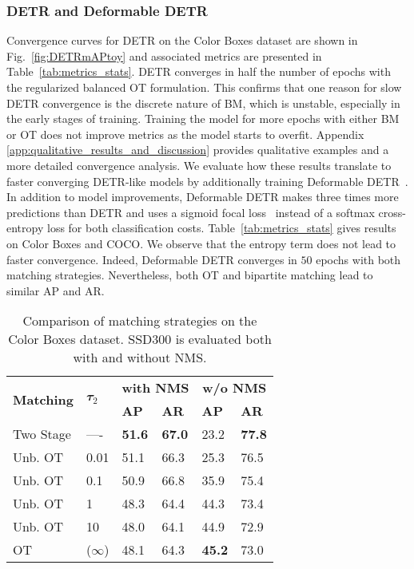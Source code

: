 \subsubsection{DETR and Deformable DETR} Convergence curves for DETR on the Color Boxes dataset are shown in Fig.~\ref{fig:DETRmAPtoy} and associated metrics are presented in Table~\ref{tab:metrics_stats}. DETR converges in half the number of epochs with the regularized balanced OT formulation. This confirms that one reason for slow DETR convergence is the discrete nature of BM, which is unstable, especially in the early stages of training. Training the model for more epochs with either BM or OT does not improve metrics as the model starts to overfit. Appendix \ref{app:qualitative_results_and_discussion} provides qualitative examples and a more detailed convergence analysis. 
We evaluate how these results translate to faster converging DETR-like models by additionally training Deformable DETR~\cite{zhu2020deformabledetr}.
In addition to model improvements, Deformable DETR makes three times more predictions than DETR and uses a sigmoid focal loss~\cite{lin2017focalloss} instead of a softmax cross-entropy loss for both classification costs.
Table~\ref{tab:metrics_stats} gives results on Color Boxes and COCO. We observe that the entropy term does not lead to faster convergence. Indeed, Deformable DETR converges in $50$ epochs with both matching strategies. Nevertheless, both OT and bipartite matching lead to similar AP and AR. 

\begin{table}
    \centering \small
    \begin{tabular}{llllll}
        \toprule
        \multirow{2}{*}{\textbf{Matching}}& \multirow{2}{*}{\textbf{$\mathbfit{\tau_2}$}} & \multicolumn{2}{c}{\textbf{with NMS}} & \multicolumn{2}{c}{\textbf{w/o NMS}} \\ \cmidrule(lr){3-4} \cmidrule(lr){5-6}
         &  & \textbf{AP} & \textbf{AR} & \textbf{AP} & \textbf{AR} \\ 
        \midrule
        Two Stage & ----    & \textbf{51.6} & \textbf{67.0} & 23.2 & \textbf{77.8} \\ \midrule
        Unb. OT & 0.01  & 51.1 & 66.3  & 25.3  & 76.5  \\ 
        Unb. OT & 0.1   & 50.9 & 66.8  & 35.9  & 75.4  \\
        Unb. OT & 1     & 48.3 & 64.4  & 44.3  & 73.4   \\
        Unb. OT & 10    & 48.0 & 64.1  & 44.9  & 72.9   \\ \midrule
        OT      & ($\infty$)   & 48.1 & 64.3  & \textbf{45.2} & 73.0  \\
        \bottomrule
    \end{tabular}
    \caption{Comparison of matching strategies on the Color Boxes dataset. SSD300 is evaluated both with and without NMS.}
    \label{tab:removal_of_nms_ssd}
\end{table}

